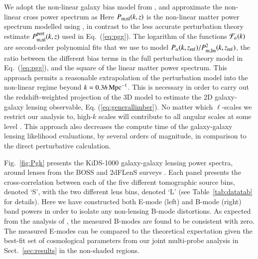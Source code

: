 We adopt the non-linear galaxy bias model from \citet{sanchez/etal:2017}, and approximate the non-linear cross power spectrum as
Here $P_{\rm m, nl}(k,z)$ is the non-linear matter power spectrum modelled using \citet{mead/etal:2015}, in contrast to the less accurate perturbation theory estimate $P_{\rm m, nl}^{\rm pert}(k,z)$ used in Eq.~(\ref{eq:pgg}). 
The logarithm of the functions ${\cal F}_\alpha(k)$ are second-order polynomial fits that we use to model $P_\alpha(k,z_{\rm ref})/P^2_{\rm m, lin}(k,z_{\rm ref})$, the ratio between the different bias terms in the full perturbation theory model in Eq.~(\ref{eq:pgg}), and the square of the linear matter power spectrum.  This approach permits a reasonable extrapolation of the \citet{sanchez/etal:2017} perturbation model into the non-linear regime beyond $k = 0.3 h \,{\rm Mpc}^{-1}$.   This is necessary in order to carry out the redshift-weighted projection of the 3D model to estimate the 2D galaxy-galaxy lensing observable, Eq. (\ref{eq:generallimber}).  No matter which $\ell$-scales we restrict our analysis to, high-$k$ scales will contribute to all angular scales at some level \citep{joachimi/etal:inprep, asgari/etal:2020}.   This approach also decreases the compute time of the galaxy-galaxy lensing likelihood evaluations, by several orders of magnitude, in comparison to the direct perturbative calculation.  

Fig.~\ref{fig:Pgk} presents the KiDS-1000 galaxy-galaxy lensing power spectra, around lenses from the BOSS and 2dFLenS surveys \citep[see][for the real-space KiDS-1000 galaxy-galaxy lensing measurements for BOSS and 2dFLenS separately]{blake/etal:2020}.   Each panel presents the cross-correlation between each of the five different tomographic source bins, denoted `S', with the two different lens bins, denoted `L' (see Table~\ref{tab:datatab} for details).  Here we have constructed both E-mode (left) and B-mode (right) band powers in order to isolate any non-lensing B-mode distortions.     As expected from the analysis of \citet{giblin/etal:inprep}, the measured B-modes are found to be consistent with zero.   The measured E-modes can be compared to the theoretical expectation given the best-fit set of cosmological parameters from our joint multi-probe analysis in Sect.~\ref{sec:results} in the non-shaded regions.    

